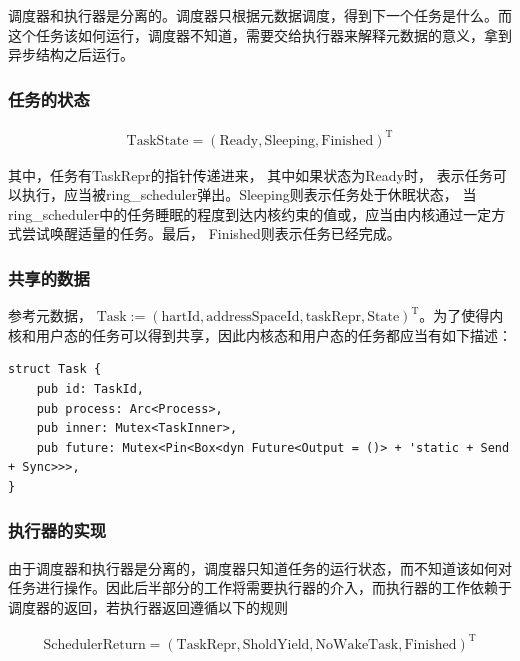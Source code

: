 调度器和执行器是分离的。调度器只根据元数据调度，得到下一个任务是什么。而这个任务该如何运行，调度器不知道，需要交给执行器来解释元数据的意义，拿到异步结构之后运行。

\subsubsection{任务的状态}

\begin{equation}
    \label{equation:c3taskstate}
    \begin{aligned}
\boldsymbol{\mathrm{TaskState}} = (\mathrm{Ready}, \mathrm{Sleeping}, \mathrm{Finished})^{\mathrm{T}}
    \end{aligned}
\end{equation}

其中，任务有TaskRepr的指针传递进来， 其中如果状态为Ready时， 表示任务可以执行，应当被ring\_scheduler弹出。Sleeping则表示任务处于休眠状态， 当ring\_scheduler中的任务睡眠的程度到达内核约束的值或，应当由内核通过一定方式尝试唤醒适量的任务。最后， Finished则表示任务已经完成。

\subsubsection{共享的数据}

参考元数据， $\boldsymbol{\mathrm{Task}} := (\mathrm{hartId}, \mathrm{addressSpaceId}, \mathrm{taskRepr}, \mathrm{State})^{\mathrm{T}}$。为了使得内核和用户态的任务可以得到共享，因此内核态和用户态的任务都应当有如下描述：

\begin{lstlisting}
struct Task {
    pub id: TaskId,
    pub process: Arc<Process>,
    pub inner: Mutex<TaskInner>,
    pub future: Mutex<Pin<Box<dyn Future<Output = ()> + 'static + Send + Sync>>>, 
}
\end{lstlisting}

\subsubsection{执行器的实现}

由于调度器和执行器是分离的，调度器只知道任务的运行状态，而不知道该如何对任务进行操作。因此后半部分的工作将需要执行器的介入，而执行器的工作依赖于调度器的返回，若执行器返回遵循以下的规则

\begin{equation}
    \label{equation:c3schedulerreturn}
    \begin{aligned}
\boldsymbol{\mathrm{SchedulerReturn}} = (\mathrm{TaskRepr}, \mathrm{SholdYield}, \mathrm{NoWakeTask}, \mathrm{Finished})^{\mathrm{T}}
    \end{aligned}
\end{equation}

